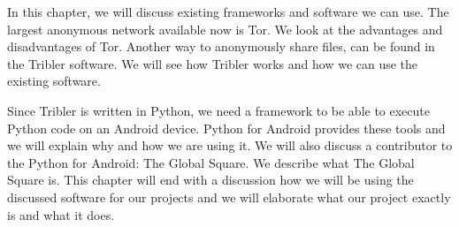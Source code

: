 
In this chapter, we will discuss existing frameworks and software we can use. The largest anonymous network available now is Tor. We look at the advantages and disadvantages of Tor. Another way to anonymously share files, can be found in the Tribler software. We will see how Tribler works and how we can use the existing software.
	
Since Tribler is written in Python, we need a framework to be able to execute Python code on an Android device. Python for Android provides these tools and we will explain why and how we are using it. We will also discuss a contributor to the Python for Android: The Global Square. We describe what The Global Square is. This chapter will end with a discussion how we will be using the discussed software for our projects and we will elaborate what our project exactly is and what it does.